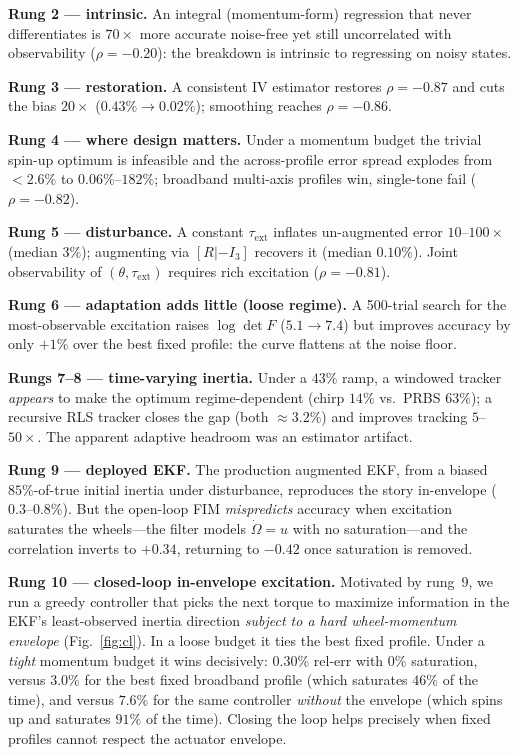 \documentclass[conference]{IEEEtran}
\begin{document}
\textbf{Rung 2 --- intrinsic.} An integral (momentum-form) regression that never differentiates is $70\times$ more accurate noise-free yet still uncorrelated with observability ($\rho=-0.20$): the breakdown is intrinsic to regressing on noisy states.

\textbf{Rung 3 --- restoration.} A consistent IV estimator restores $\rho=-0.87$ and cuts the bias $20\times$ ($0.43\%\to0.02\%$); smoothing reaches $\rho=-0.86$.

\textbf{Rung 4 --- where design matters.} Under a momentum budget the trivial spin-up optimum is infeasible and the across-profile error spread explodes from ${<}2.6\%$ to $0.06\%$--$182\%$; broadband multi-axis profiles win, single-tone fail ($\rho=-0.82$).

\textbf{Rung 5 --- disturbance.} A constant $\tau_\mathrm{ext}$ inflates un-augmented error $10$--$100\times$ (median $3\%$); augmenting via $[R|{-}I_3]$ recovers it (median $0.10\%$). Joint observability of $(\theta,\tau_\mathrm{ext})$ requires rich excitation ($\rho=-0.81$).

\textbf{Rung 6 --- adaptation adds little (loose regime).} A 500-trial search for the most-observable excitation raises $\log\det F$ ($5.1\to7.4$) but improves accuracy by only $+1\%$ over the best fixed profile: the curve flattens at the noise floor.

\textbf{Rungs 7--8 --- time-varying inertia.} Under a $43\%$ ramp, a windowed tracker \emph{appears} to make the optimum regime-dependent (chirp $14\%$ vs.\ PRBS $63\%$); a recursive RLS tracker closes the gap (both $\approx3.2\%$) and improves tracking $5$--$50\times$. The apparent adaptive headroom was an estimator artifact.

\textbf{Rung 9 --- deployed EKF.} The production augmented EKF, from a biased $85\%$-of-true initial inertia under disturbance, reproduces the story in-envelope ($0.3$--$0.8\%$). But the open-loop FIM \emph{mispredicts} accuracy when excitation saturates the wheels---the filter models $\dot\Omega=u$ with no saturation---and the correlation inverts to $+0.34$, returning to $-0.42$ once saturation is removed.

\textbf{Rung 10 --- closed-loop in-envelope excitation.} Motivated by rung~9, we run a greedy controller that picks the next torque to maximize information in the EKF's least-observed inertia direction \emph{subject to a hard wheel-momentum envelope} (Fig.~\ref{fig:cl}). In a loose budget it ties the best fixed profile. Under a \emph{tight} momentum budget it wins decisively: $0.30\%$ rel-err with $0\%$ saturation, versus $3.0\%$ for the best fixed broadband profile (which saturates $46\%$ of the time), and versus $7.6\%$ for the same controller \emph{without} the envelope (which spins up and saturates $91\%$ of the time). Closing the loop helps precisely when fixed profiles cannot respect the actuator envelope.
\end{document}
